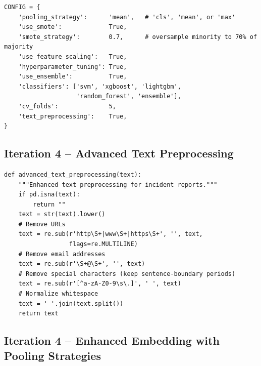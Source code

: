 \documentclass[11pt, titlepage, bibliography=totoc]{scrreprt}
\begin{document}
\begin{lstlisting}[label=lst:iter4-config,
  caption={Iteration~4 configuration dictionary controlling all pipeline parameters.}]
CONFIG = {
    'pooling_strategy':      'mean',   # 'cls', 'mean', or 'max'
    'use_smote':             True,
    'smote_strategy':        0.7,      # oversample minority to 70% of majority
    'use_feature_scaling':   True,
    'hyperparameter_tuning': True,
    'use_ensemble':          True,
    'classifiers': ['svm', 'xgboost', 'lightgbm',
                    'random_forest', 'ensemble'],
    'cv_folds':              5,
    'text_preprocessing':    True,
}
\end{lstlisting}

\subsection*{Iteration 4 -- Advanced Text Preprocessing}

\begin{lstlisting}[label=lst:text-preprocessing,
  caption={Advanced text preprocessing applied to incident report fields in Iteration~4.}]
def advanced_text_preprocessing(text):
    """Enhanced text preprocessing for incident reports."""
    if pd.isna(text):
        return ""
    text = str(text).lower()
    # Remove URLs
    text = re.sub(r'http\S+|www\S+|https\S+', '', text,
                  flags=re.MULTILINE)
    # Remove email addresses
    text = re.sub(r'\S+@\S+', '', text)
    # Remove special characters (keep sentence-boundary periods)
    text = re.sub(r'[^a-zA-Z0-9\s\.]', ' ', text)
    # Normalize whitespace
    text = ' '.join(text.split())
    return text
\end{lstlisting}

\subsection*{Iteration 4 -- Enhanced Embedding with Pooling Strategies}
\end{document}
